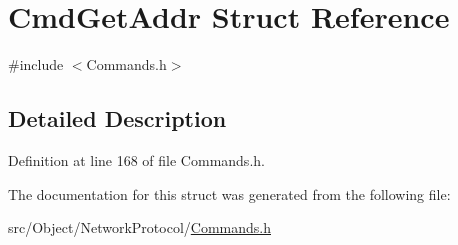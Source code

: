 \hypertarget{struct_cmd_get_addr}{
\section{CmdGetAddr Struct Reference}
\label{struct_cmd_get_addr}
}


{\ttfamily \#include $<$Commands.h$>$}



\subsection{Detailed Description}


Definition at line 168 of file Commands.h.



The documentation for this struct was generated from the following file:\begin{DoxyCompactItemize}
\item 
src/Object/NetworkProtocol/\hyperlink{_commands_8h}{Commands.h}\end{DoxyCompactItemize}
